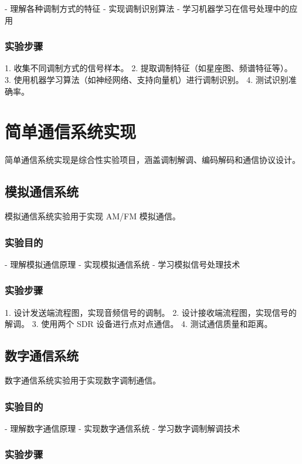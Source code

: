 \documentclass[UTF8]{ctexbook}
\begin{document}
- 理解各种调制方式的特征
- 实现调制识别算法
- 学习机器学习在信号处理中的应用

\subsubsection{实验步骤}

1. 收集不同调制方式的信号样本。
2. 提取调制特征（如星座图、频谱特征等）。
3. 使用机器学习算法（如神经网络、支持向量机）进行调制识别。
4. 测试识别准确率。

\section{简单通信系统实现}

简单通信系统实现是综合性实验项目，涵盖调制解调、编码解码和通信协议设计。

\subsection{模拟通信系统}

模拟通信系统实验用于实现 AM/FM 模拟通信。

\subsubsection{实验目的}

- 理解模拟通信原理
- 实现模拟通信系统
- 学习模拟信号处理技术

\subsubsection{实验步骤}

1. 设计发送端流程图，实现音频信号的调制。
2. 设计接收端流程图，实现信号的解调。
3. 使用两个 SDR 设备进行点对点通信。
4. 测试通信质量和距离。

\subsection{数字通信系统}

数字通信系统实验用于实现数字调制通信。

\subsubsection{实验目的}

- 理解数字通信原理
- 实现数字通信系统
- 学习数字调制解调技术

\subsubsection{实验步骤}
\end{document}
